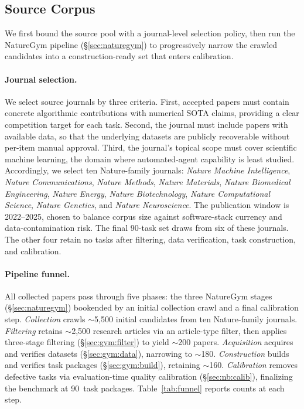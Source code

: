 \documentclass{llmxive}
\begin{document}
\subsection{Source Corpus}
\label{sec:nb:corpus}

We first bound the source pool with a journal-level selection policy, then run the NatureGym pipeline (\S\ref{sec:naturegym}) to progressively narrow the crawled candidates into a construction-ready set that enters calibration.

\paragraph{Journal selection.} We select source journals by three criteria.
First, accepted papers must contain concrete algorithmic contributions with numerical SOTA claims, providing a clear competition target for each task.
Second, the journal must include papers with available data, so that the underlying datasets are publicly recoverable without per-item manual approval.
Third, the journal's topical scope must cover scientific machine learning, the domain where automated-agent capability is least studied.
Accordingly, we select ten Nature-family journals: \emph{Nature Machine Intelligence}, \emph{Nature Communications}, \emph{Nature Methods}, \emph{Nature Materials}, \emph{Nature Biomedical Engineering}, \emph{Nature Energy}, \emph{Nature Biotechnology}, \emph{Nature Computational Science}, \emph{Nature Genetics}, and \emph{Nature Neuroscience}. The publication window is 2022--2025, chosen to balance corpus size against software-stack currency and data-contamination risk.
The final 90-task set draws from six of these journals. The other four retain no tasks after filtering, data verification, task construction, and calibration.

\paragraph{Pipeline funnel.} All collected papers pass through five phases: the three NatureGym stages (\S\ref{sec:naturegym}) bookended by an initial collection crawl and a final calibration step.
\emph{Collection} crawls ${\sim}$5{,}500 initial candidates from ten Nature-family journals.
\emph{Filtering} retains ${\sim}$2{,}500 research articles via an article-type filter, then applies three-stage filtering (\S\ref{sec:gym:filter}) to yield ${\sim}$200 papers.
\emph{Acquisition} acquires and verifies datasets (\S\ref{sec:gym:data}), narrowing to ${\sim}$180.
\emph{Construction} builds and verifies task packages (\S\ref{sec:gym:build}), retaining ${\sim}$160.
\emph{Calibration} removes defective tasks via evaluation-time quality calibration (\S\ref{sec:nb:calib}), finalizing the benchmark at 90~task packages.
Table~\ref{tab:funnel} reports counts at each step.
\end{document}
